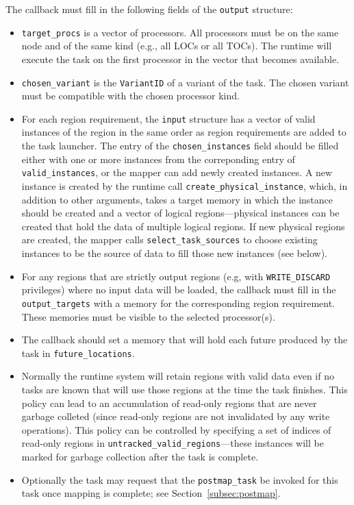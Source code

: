 The callback must fill in the following fields of the {\tt output} structure:
\begin{itemize}
\item {\tt target\_procs} is a vector of processors.  All processors must be on the same node and of the same kind (e.g., all LOCs or all TOCs).  The runtime will execute the task on the first processor in the vector that becomes available.
\item {\tt chosen\_variant} is the {\tt VariantID} of a variant of the task.  The chosen variant must be compatible with the chosen processor kind.
\item For each region requirement, the {\tt input} structure has a vector of valid instances of the region in the same order
  as region requirements are added to the task launcher.  The entry of the {\tt chosen\_instances} field should be filled either  with one or more
  instances from the correponding entry of {\tt valid\_instances}, or the mapper can add newly created instances.  A new instance is created by the runtime call
  {\tt create\_physical\_instance}, which, in addition to other arguments, takes a target memory in which the instance should be created and a vector of logical regions---physical instances can be created that hold the data of multiple logical regions.
  If new physical regions are created, the mapper calls {\tt select\_task\_sources} to choose existing instances to be the source of data to fill those new instances (see below).

\item For any regions that are strictly output regions (e.g, with {\tt WRITE\_DISCARD} privileges) where no input data will be loaded, the callback must fill in the {\tt output\_targets} with a memory for the corresponding
  region requirement.  These memories must be visible to the selected processor(s).
  
\item The callback should set a memory that will hold each future produced by the task in {\tt future\_locations}.

\item Normally the runtime system will retain regions with valid data even if no tasks are known that will use those regions at the time the task finishes.  This policy can lead to an accumulation of read-only regions that are never garbage colleted (since read-only regions
  are not invalidated by any write operations).  This policy can be controlled by specifying a set of indices of read-only regions
  in {\tt untracked\_valid\_regions}---these instances will be marked for garbage collection after the task is complete.

\item Optionally the task may request that the {\tt postmap\_task} be invoked for this task once mapping is complete; see Section~\ref{subsec:postmap}.
\end{itemize}  



